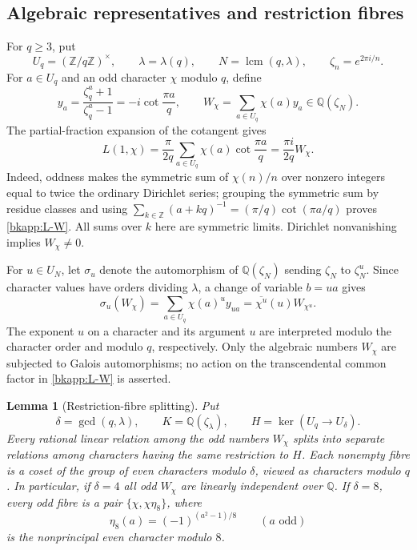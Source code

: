 \documentclass[11pt,a4paper]{article}
\newtheorem{lemma}[theorem]{Lemma}
\theoremstyle{definition}
\theoremstyle{remark}
\begin{document}
\subsection{Algebraic representatives and restriction fibres}

For $q\geq3$, put
\[
 U_q=(\mathbb Z/q\mathbb Z)^\times,
 \qquad \lambda=\lambda(q),\qquad
 N=\operatorname{lcm}(q,\lambda),\qquad
 \zeta_n=e^{2\pi i/n}.
\]
For $a\in U_q$ and an odd character $\chi$ modulo $q$, define
\[
 y_a=\frac{\zeta_q^a+1}{\zeta_q^a-1}
     =-i\cot\frac{\pi a}{q},
 \qquad
 W_\chi=\sum_{a\in U_q}\chi(a)y_a
       \in\mathbb Q(\zeta_N).
\]
The partial-fraction expansion of the cotangent gives
\begin{equation}
\label{bkapp:L-W}
 L(1,\chi)=\frac{\pi}{2q}
   \sum_{a\in U_q}\chi(a)\cot\frac{\pi a}{q}
 =\frac{\pi i}{2q}W_\chi.
\end{equation}
Indeed, oddness makes the symmetric sum of $\chi(n)/n$ over nonzero
integers equal to twice the ordinary Dirichlet series; grouping the
symmetric sum by residue classes and using
$\sum_{k\in\mathbb Z}(a+kq)^{-1}=(\pi/q)\cot(\pi a/q)$ proves
\eqref{bkapp:L-W}.  All sums over $k$ here are symmetric limits.
Dirichlet nonvanishing implies $W_\chi\ne0$.

For $u\in U_N$, let $\sigma_u$ denote the automorphism of
$\mathbb Q(\zeta_N)$ sending $\zeta_N$ to $\zeta_N^u$.
Since character values have orders dividing $\lambda$, a change of
variable $b=ua$ gives
\begin{equation}
\label{bkapp:galois}
 \sigma_u(W_\chi)
 =\sum_{a\in U_q}\chi(a)^u y_{ua}
 =\overline{\chi^u}(u)W_{\chi^u}.
\end{equation}
The exponent $u$ on a character and its argument $u$ are interpreted
modulo the character order and modulo $q$, respectively.
Only the algebraic numbers $W_\chi$ are subjected to Galois
automorphisms; no action on the transcendental common factor in
\eqref{bkapp:L-W} is asserted.

\begin{lemma}[Restriction-fibre splitting]
\label{bkapp:fibres}
Put
\[
 \delta=\gcd(q,\lambda),\qquad
 K=\mathbb Q(\zeta_\lambda),\qquad
 H=\ker(U_q\longrightarrow U_\delta).
\]
Every rational linear relation among the odd numbers $W_\chi$ splits
into separate relations among characters having the same restriction
to $H$.  Each nonempty fibre is a coset of the group of even
characters modulo $\delta$, viewed as characters modulo $q$.
In particular, if $\delta=4$ all odd $W_\chi$ are linearly independent
over $\mathbb Q$.  If $\delta=8$, every odd fibre is a pair
$\{\chi,\chi\eta_8\}$, where
\[
 \eta_8(a)=(-1)^{(a^2-1)/8}\qquad(a\text{ odd})
\]
is the nonprincipal even character modulo $8$.
\end{lemma}
\end{document}
